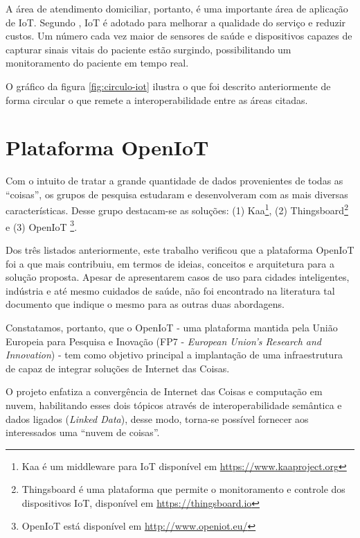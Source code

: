 A área de atendimento domiciliar, portanto, é uma importante área de aplicação de IoT.
Segundo , IoT é adotado para melhorar a qualidade
do serviço e reduzir custos. Um número cada vez maior de sensores de saúde e
dispositivos capazes de capturar sinais vitais do paciente estão
surgindo, possibilitando um monitoramento do paciente em tempo real.

O gráfico da figura \ref{fig:circulo-iot} ilustra o que foi descrito
anteriormente de forma circular o que remete a interoperabilidade entre as
áreas citadas.


\section{Plataforma OpenIoT}\label{sec:openiot}

Com o intuito de tratar a grande quantidade de dados provenientes de todas as
``coisas'', os grupos de pesquisa estudaram e desenvolveram \middlewares[] com as
mais diversas características. Desse grupo destacam-se as soluções: (1) Kaa\footnote{Kaa é um
middleware para IoT disponível em \url{https://www.kaaproject.org}},
(2) Thingsboard\footnote{Thingsboard é uma plataforma que permite o monitoramento 
e controle dos dispositivos IoT, disponível em \url{https://thingsboard.io}} e (3) OpenIoT
\footnote{OpenIoT está disponível em \url{http://www.openiot.eu/}}.

Dos três listados anteriormente, este trabalho verificou que a plataforma
OpenIoT foi a que mais contribuiu, em termos de ideias, conceitos e arquitetura
para a solução proposta. Apesar de apresentarem casos de uso para cidades
inteligentes, indústria e até mesmo cuidados de saúde, não foi encontrado na
literatura tal documento que indique o mesmo para as outras duas abordagens.

Constatamos, portanto, que o OpenIoT - uma plataforma mantida pela União
Europeia para Pesquisa e Inovação (FP7 - \textit{European Union's Research and
Innovation}) - tem como objetivo principal a implantação de uma infraestrutura
de \middleware[] capaz de integrar soluções de Internet das Coisas.

O projeto enfatiza a convergência de Internet das Coisas e computação em nuvem,
habilitando esses dois tópicos através de interoperabilidade semântica e dados
ligados (\textit{Linked Data}), desse modo, torna-se possível fornecer aos interessados
uma ``nuvem de coisas''.

